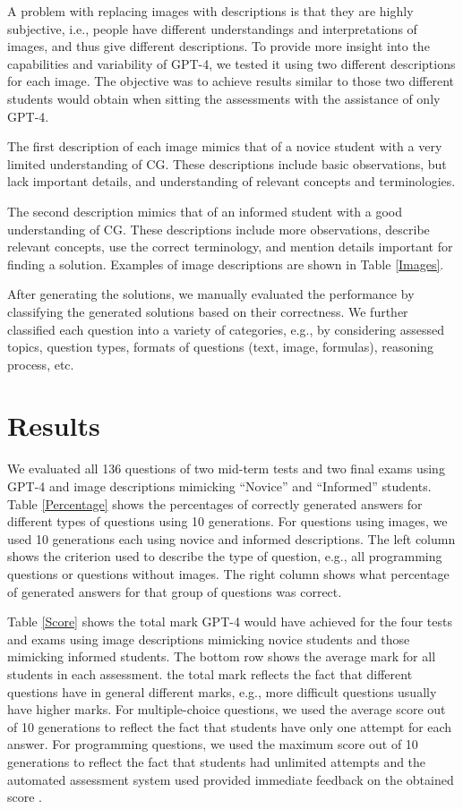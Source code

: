 \documentclass[sigconf,review]{acmart}
\begin{document}
\label{imageslimitation}
A problem with replacing images with descriptions is that they are highly subjective, i.e., people have different understandings and interpretations of images, and thus give different descriptions. To provide more insight into the capabilities and variability of GPT-4, we tested it using two different descriptions for each image. The objective was to achieve results similar to those two different students would obtain when sitting the assessments with the assistance of only GPT-4.

The first description of each image mimics that of a novice student with a very limited understanding of CG. These descriptions include basic observations, but lack important details, and understanding of relevant concepts and terminologies. 

The second description mimics that of an informed student with a good understanding of CG. These descriptions include more observations, describe relevant concepts, use the correct terminology, and mention details important for finding a solution. Examples of image descriptions are shown in Table \ref{Images}.

After generating the solutions, we manually evaluated the performance by classifying the generated solutions based on their correctness. We further classified each question into a variety of categories, e.g., by considering assessed topics, question types, formats of questions (text, image, formulas), reasoning process, etc.

\section{Results}

We evaluated all 136 questions of two mid-term tests and two final exams using GPT-4 and image descriptions mimicking ``Novice'' and ``Informed'' students.
Table \ref{Percentage} shows the percentages of correctly generated answers for different types of questions using 10 generations. For questions using images, we used 10 generations each using novice and informed descriptions. The left column shows the criterion used to describe the type of question, e.g., all programming questions or questions without images. The right column shows what percentage of generated answers for that group of questions was correct.

Table \ref{Score} shows the total mark GPT-4 would have achieved for the four tests and exams using image descriptions mimicking novice students and those mimicking informed students. The bottom row shows the average mark for all students in each assessment. the total mark reflects the fact that different questions have in general different marks, e.g., more difficult questions usually have higher marks.
For multiple-choice questions, we used the average score out of 10 generations to reflect the fact that students have only one attempt for each answer. 
For programming questions, we used the maximum score out of 10 generations to reflect the fact that students had unlimited attempts and the automated assessment system used provided immediate feedback on the obtained score \cite{codeRunner1}.
\end{document}
